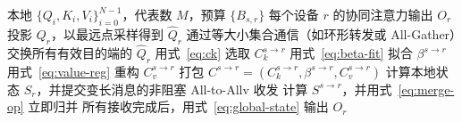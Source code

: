 \documentclass[sigconf,nonacm]{acmart}
\begin{document}
\begin{algorithm}[t]
\caption{DCC-KV 的单层单 KV Head 流程}
\label{alg:dcckv}
\begin{algorithmic}[1]
\Require 本地 $\{Q_i, K_i, V_i\}_{i=0}^{N-1}$，代表数 $M$，预算 $\{B_{s,r}\}$
\Ensure 每个设备 $r$ 的协同注意力输出 $O_r$
  \State 投影 $Q_r$，以最远点采样得到 $\widehat{Q}_r$
\EndFor
\State 通过等大小集合通信（如环形转发或 All-Gather）交换所有有效目的端的 $\widehat{Q}_r$
  \State 用式~\eqref{eq:ck} 选取 $C_k^{s \to r}$
  \State 用式~\eqref{eq:beta-fit} 拟合 $\beta^{s \to r}$
  \State 用式~\eqref{eq:value-reg} 重构 $C_v^{s \to r}$
  \State 打包 $C^{s \to r} = (C_k^{s \to r}, \beta^{s \to r}, C_v^{s \to r})$
\EndFor
{}
  \State 计算本地状态 $S_r$，并提交变长消息的非阻塞 All-to-Allv 收发
    \State 计算 $S^{s \to r}$，并用式~\eqref{eq:merge-op} 立即归并
  \EndFor
  \State 所有接收完成后，用式~\eqref{eq:global-state} 输出 $O_r$
\EndFor
\end{algorithmic}
\end{algorithm}







\label{sec:refs}
\end{document}
